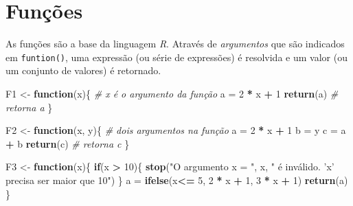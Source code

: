 \documentclass[
]{book}
\newenvironment{Shaded}{\begin{snugshade}}{\end{snugshade}}
\newcommand{\CommentTok}[1]{\textcolor[rgb]{0.56,0.35,0.01}{\textit{#1}}}
\newcommand{\ControlFlowTok}[1]{\textcolor[rgb]{0.13,0.29,0.53}{\textbf{#1}}}
\newcommand{\DecValTok}[1]{\textcolor[rgb]{0.00,0.00,0.81}{#1}}
\newcommand{\KeywordTok}[1]{\textcolor[rgb]{0.13,0.29,0.53}{\textbf{#1}}}
\newcommand{\NormalTok}[1]{#1}
\newcommand{\OperatorTok}[1]{\textcolor[rgb]{0.81,0.36,0.00}{\textbf{#1}}}
\newcommand{\StringTok}[1]{\textcolor[rgb]{0.31,0.60,0.02}{#1}}
\begin{document}
\hypertarget{funuxe7uxf5es}{%
\section{Funções}\label{funuxe7uxf5es}}

As funções  são a base da linguagem \emph{R}. Através de \emph{argumentos} que são indicados em \texttt{funtion()}, uma expressão (ou série de expressões) é resolvida e um valor (ou um conjunto de valores) é retornado. 

\begin{Shaded}
\begin{Highlighting}[]
\NormalTok{F1 <-}\StringTok{ }\ControlFlowTok{function}\NormalTok{(x)\{ }\CommentTok{# x é o argumento da função}
\NormalTok{  a =}\StringTok{ }\DecValTok{2} \OperatorTok{*}\StringTok{ }\NormalTok{x }\OperatorTok{+}\StringTok{ }\DecValTok{1}
  \KeywordTok{return}\NormalTok{(a) }\CommentTok{# retorna a}
\NormalTok{\}}

\NormalTok{F2 <-}\StringTok{ }\ControlFlowTok{function}\NormalTok{(x, y)\{ }\CommentTok{# dois argumentos na função}
\NormalTok{  a =}\StringTok{ }\DecValTok{2} \OperatorTok{*}\StringTok{ }\NormalTok{x }\OperatorTok{+}\StringTok{ }\DecValTok{1}
\NormalTok{  b =}\StringTok{ }\NormalTok{y}
\NormalTok{  c =}\StringTok{ }\NormalTok{a }\OperatorTok{+}\StringTok{ }\NormalTok{b}
  \KeywordTok{return}\NormalTok{(c) }\CommentTok{# retorna c}
\NormalTok{\}}

\NormalTok{F3 <-}\StringTok{ }\ControlFlowTok{function}\NormalTok{(x)\{}
  \ControlFlowTok{if}\NormalTok{(x }\OperatorTok{>}\StringTok{ }\DecValTok{10}\NormalTok{)\{}
    \KeywordTok{stop}\NormalTok{(}\StringTok{"O argumento x = "}\NormalTok{, x, }\StringTok{" é inválido. 'x' precisa ser maior que 10"}\NormalTok{)}
\NormalTok{  \}}
\NormalTok{  a =}\StringTok{ }\KeywordTok{ifelse}\NormalTok{(x}\OperatorTok{<=}\StringTok{ }\DecValTok{5}\NormalTok{, }\DecValTok{2} \OperatorTok{*}\StringTok{ }\NormalTok{x }\OperatorTok{+}\StringTok{ }\DecValTok{1}\NormalTok{, }\DecValTok{3} \OperatorTok{*}\StringTok{ }\NormalTok{x }\OperatorTok{+}\StringTok{ }\DecValTok{1}\NormalTok{)}
  \KeywordTok{return}\NormalTok{(a)}
\NormalTok{\}}


\end{Highlighting}
\end{Shaded}
\end{document}
